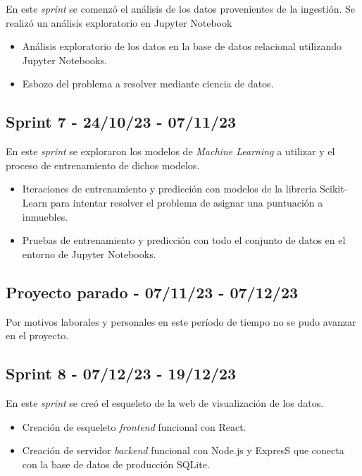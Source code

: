 En este \textit{sprint} se comenzó el análisis de los datos provenientes de la ingestión. Se realizó un análisis exploratorio en Jupyter Notebook

\begin{itemize}
    \item Análisis exploratorio de los datos en la base de datos relacional utilizando Jupyter Notebooks.
    \item Esbozo del problema a resolver mediante ciencia de datos.
\end{itemize}


\subsection{Sprint 7 -  24/10/23 - 07/11/23}

En este \textit{sprint} se exploraron los modelos de \textit{\textit{\textit{Machine Learning}}} a utilizar y el proceso de entrenamiento de dichos modelos.

\begin{itemize}
    \item Iteraciones de entrenamiento y predicción con modelos de la libreria Scikit-Learn para intentar resolver el problema de asignar una puntuación a inmuebles.
    \item Pruebas de entrenamiento y predicción con todo el conjunto de datos en el entorno de Jupyter Notebooks.
\end{itemize}

\subsection{Proyecto parado -  07/11/23 - 07/12/23}

Por motivos laborales y personales en este período de tiempo no se pudo avanzar en el proyecto.

\subsection{Sprint 8 -  07/12/23 - 19/12/23}

En este \textit{sprint} se creó el esqueleto de la web de visualización de los datos.

\begin{itemize}
    \item Creación de esqueleto \textit{frontend} funcional con React.
    \item Creación de servidor \textit{backend} funcional con Node.js y ExpresS que conecta con la base de datos de producción SQLite.
\end{itemize}

